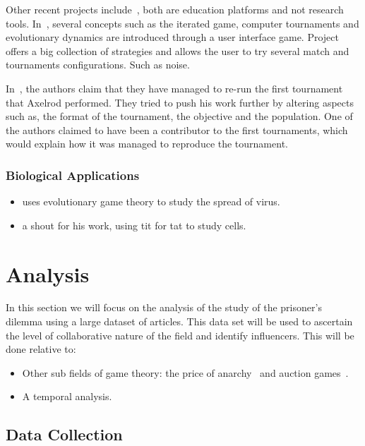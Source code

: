 \documentclass{article}
\begin{document}
Other recent projects include~\cite{pd_trust, pd_game}, both are education
platforms and not research tools. In~\cite{pd_trust}, several concepts such as
the iterated game, computer tournaments and evolutionary dynamics are introduced
through a user interface game. Project~\cite{pd_game} offers a big collection of
strategies and allows the user to try several match and tournaments configurations.
Such as noise.

In~\cite{Rapoport2015}, the authors claim that they have managed to
re-run the first tournament that Axelrod performed. They tried to push his work
further by altering aspects such as, the format of the tournament, the objective
and the population. One of the authors claimed to have been a contributor
to the first tournaments, which would explain how it was managed to reproduce
the tournament.

\subsubsection{Biological Applications}
\begin{itemize}
    \item \cite{Turner1999} uses evolutionary game theory to study the spread of
    virus.
    \item \cite{Douglas2011} a shout for his work, using tit for tat to study cells.
\end{itemize}

\section{Analysis}\label{section:analysis}

In this section we will focus on the analysis of the study of the prisoner's dilemma
using a large dataset of articles. This data set will be used to ascertain the level
of collaborative nature of the field and identify influencers. This will be done
relative to:

\begin{itemize}
    \item Other sub fields of game theory: the price of anarchy~\cite{roughgarden2005}
    and auction games~\cite{menezes2005}.
    \item A temporal analysis.
\end{itemize}

\subsection{Data Collection}
\end{document}
